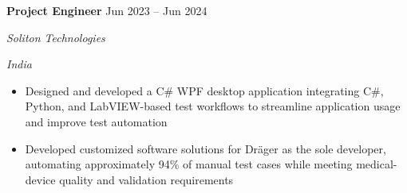 \documentclass[letterpaper,10pt]{article}
\newlength{\roleheadingright}
\newcommand{\roleheading}[4]{%
  \textbf{#1} \hfill #2\\
  \settowidth{\roleheadingright}{\textit{#4}}%
  \parbox[t]{\dimexpr\linewidth-\roleheadingright-1em\relax}{\raggedright\textit{#3}}%
  \hfill\parbox[t]{\roleheadingright}{\raggedleft\textit{#4}}\vspace{1pt}
}
\newenvironment{resumeitems}{\begin{itemize}}{\end{itemize}}
\begin{document}
\roleheading{Project Engineer}{Jun 2023 -- Jun 2024}{Soliton Technologies}{India}
\begin{resumeitems}
  \item Designed and developed a C\# WPF desktop application integrating C\#, Python, and LabVIEW-based test workflows to streamline application usage and improve test automation
  \item Developed customized software solutions for Dr\"ager as the sole developer, automating approximately 94\% of manual test cases while meeting medical-device quality and validation requirements
\end{resumeitems}
\end{document}
